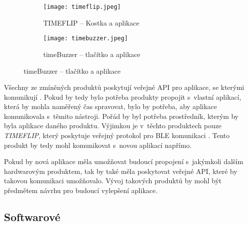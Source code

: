 \begin{figure}[h]
	\centering
	\begin{subfigure}[b]{5.2cm}
		\texttt{[image: timeflip.jpeg]}
		\caption{TIMEFLIP – Kostka a aplikace \cite{timeflip}}
		\label{pic:timeflip}
	\end{subfigure}
	\hspace{2cm}
	\begin{subfigure}[b]{7cm}
		\texttt{[image: timebuzzer.jpeg]}
		\caption{timeBuzzer – tlačítko a aplikace \cite{timebuzzer}}
		\label{pic:timebuzzer}
	\end{subfigure}
\end{figure}

Všechny ze zmíněných produktů poskytují veřejné API pro aplikace, se kterými komunikují \cite{timeflip-api} \cite{timeular-api} \cite{timebuzzer-api}. Pokud by tedy bylo potřeba produkty propojit s~vlastní aplikací, která by mohla naměřený čas spravovat, bylo by potřeba, aby aplikace komunikovala s~těmito nástroji. Pořád by byl potřeba prostředník, kterým by byla aplikace daného produktu. Výjimkou je v~těchto produktech pouze \emph{TIMEFLIP}, který poskytuje veřejný protokol pro BLE komunikaci \cite{timeflip-ble-api}. Tento produkt by tedy mohl komunikovat s~novou aplikací napřímo.

Pokud by nová aplikace měla umožňovat budoucí propojení s~jakýmkoli dalším hardwarovým produktem, tak by také měla poskytovat veřejné API, které by takovou komunikaci umožňovalo. Vývoj takových produktů by mohl být předmětem návrhu pro budoucí vylepšení aplikace.

\subsection{Softwarové}

